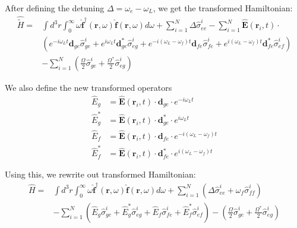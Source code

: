 \documentclass[a4paper, 11pt]{article}
\numberwithin{equation}{section}
\begin{document}
After defining the detuning $\Delta = \omega_e - \omega_L$, we get the transformed
Hamiltonian:
\begin{equation}
  \begin{aligned}
    \hat{\tilde{H}} = & \int d^3r \int_0^\infty \omega \hat{\mathbf{f}}^\dagger
    (\mathbf{r}, \omega) \hat{\mathbf{f}}(\mathbf{r}, \omega) d\omega + \sum_{i=1}^N
    \Delta \hat{\sigma}_{ee}^i -\sum_{i=1}^N \hat{\mathbf{E}}(\mathbf{r}_i, t) \cdot
    \\&\left( e^{-i\omega_Lt}\mathbf{d}_{ge} \hat{\sigma}^i_{ge} +
    e^{i\omega_Lt} \mathbf{d}_{ge}^* \hat{\sigma}^i_{eg} + e^{-i(\omega_L - \omega_f)t}
    \mathbf{d}_{fe} \hat{\sigma}^i_{fe} + e^{i(\omega_L-\omega_f)t} \mathbf{d}_{fe}^*
    \hat{\sigma}^i_{ef} \right)\\ &-\sum_{i=1}^N \left(\frac{\Omega}{2}
    \hat{\sigma}_{ge}^i + \frac{\Omega^*}{2} \hat{\sigma}_{eg}^i\right)
  \end{aligned}
\end{equation}

We also define the new transformed operators
\begin{align}
  \hat{E}_{g} &= \hat{\mathbf{E}}(\mathbf{r}_i, t) \cdot \mathbf{d}_{ge} \cdot
  e^{-i\omega_Lt}\\
  \hat{E}^*_{g} &= \hat{\mathbf{E}}(\mathbf{r}_i, t) \cdot \mathbf{d}^*_{ge} \cdot
  e^{i\omega_Lt}\\
  \hat{E}_{f} &= \hat{\mathbf{E}}(\mathbf{r}_i, t) \cdot \mathbf{d}_{fe} \cdot
  e^{-i(\omega_L-\omega_f)t}\\
  \hat{E}^*_{f} &= \hat{\mathbf{E}}(\mathbf{r}_i, t) \cdot \mathbf{d}^*_{fe} \cdot
  e^{i(\omega_L-\omega_f)t}
\end{align}

Using this, we rewrite out transformed Hamiltonian:
\begin{equation}
  \begin{aligned}
    \hat{H} = & \int d^3r \int_0^\infty \omega \hat{\mathbf{f}}^\dagger (\mathbf{r},
    \omega) \hat{\mathbf{f}}(\mathbf{r}, \omega) d\omega + \sum_{i=1}^N \left(\Delta
      \hat{\sigma}_{ee}^i + \omega_f
    \hat{\sigma}_{ff}^i\right)\\&-\sum_{i=1}^N \left(\hat{E}_g\hat{\sigma}_{ge}^i +
    \hat{E}^*_g\hat{\sigma}_{eg}^i + \hat{E}_f\hat{\sigma}_{fe}^i + \hat{E}^*_f
    \hat{\sigma}_{ef}^i\right)- \left( \frac{\Omega}{2} \hat{\sigma}_{ge}^i +
    \frac{\Omega^*}{2}\hat{\sigma}_{eg}^i\right)
  \end{aligned}
\end{equation}
\end{document}
